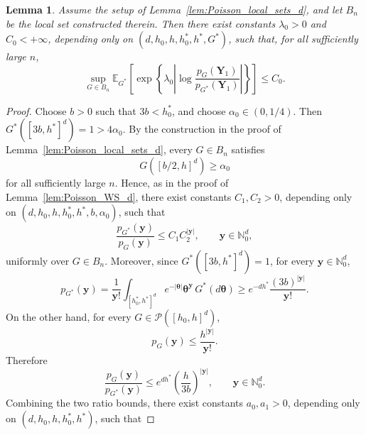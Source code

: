 \documentclass[twoside,12pt]{article}
\newcommand{\E}{\mathds{E}}
\newtheorem{lem}[thm]{Lemma}
\begin{document}
\begin{lem}\label{lem:Poisson_HP_exp_moment_d}
Assume the setup of Lemma~\ref{lem:Poisson_local_sets_d}, and let $B_n$ be the local set constructed therein. Then there exist constants $\lambda_0>0$ and $C_0<+\infty$, depending only on $(d,h_0,h,h_0^\ast,h^\ast,G^\ast)$, such that, for all sufficiently large $n$, 
\begin{displaymath}
\sup_{G\in B_n} \E_{G^\ast}\!\left[ \exp\!\left\{ \lambda_0 \left| \log\frac{p_G(\boldsymbol Y_1)}{p_{G^\ast}(\boldsymbol Y_1)} \right| \right\} \right] \le C_0.
\end{displaymath}
\end{lem}

\begin{proof}
Choose $b>0$ such that $3b<h_0^\ast$, and choose $\alpha_0\in(0,1/4)$. Then $G^\ast([3b,h^\ast]^d)=1>4\alpha_0$. By the construction in the proof of Lemma~\ref{lem:Poisson_local_sets_d}, every $G\in B_n$ satisfies
\begin{displaymath}
G([b/2,h]^d)\ge \alpha_0
\end{displaymath}
for all sufficiently large $n$. Hence, as in the proof of Lemma~\ref{lem:Poisson_WS_d}, there exist constants $C_1,C_2>0$, depending only on $(d,h_0,h,h_0^\ast,h^\ast,b,\alpha_0)$, such that
\begin{displaymath}
\frac{p_{G^\ast}(\boldsymbol y)}{p_G(\boldsymbol y)}\le C_1 C_2^{|\boldsymbol y|},\qquad\boldsymbol y\in\mathbb N_0^d,
\end{displaymath}
uniformly over $G\in B_n$. Moreover, since $G^\ast([3b,h^\ast]^d)=1$, for every $\boldsymbol y\in\mathbb N_0^d$,
\begin{displaymath}
p_{G^\ast}(\boldsymbol y)=\frac{1}{\boldsymbol y!}\int_{[h_0^\ast,h^\ast]^d}e^{-|\boldsymbol\theta|}\boldsymbol\theta^{\boldsymbol y}\,G^\ast(d\boldsymbol\theta)\ge
e^{-dh^\ast}\frac{(3b)^{|\boldsymbol y|}}{\boldsymbol y!}.
\end{displaymath}
On the other hand, for every $G\in\mathcal P([h_0,h]^d)$,
\begin{displaymath}
p_G(\boldsymbol y)\le\frac{h^{|\boldsymbol y|}}{\boldsymbol y!}.
\end{displaymath}
Therefore
\begin{displaymath}
\frac{p_G(\boldsymbol y)}{p_{G^\ast}(\boldsymbol y)}\le e^{dh^\ast}\left(\frac{h}{3b}\right)^{|\boldsymbol y|},\qquad\boldsymbol y\in\mathbb N_0^d .
\end{displaymath}
Combining the two ratio bounds, there exist constants $a_0,a_1>0$, depending only on $(d,h_0,h,h_0^\ast,h^\ast)$, such that

\end{proof}
\end{document}
